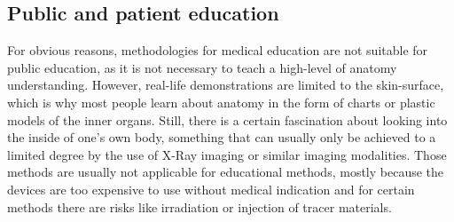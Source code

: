 \subsection{Public and patient education}
For obvious reasons, methodologies for medical education are not suitable for public education, as it is not necessary to teach a high-level of anatomy understanding. 
However, real-life demonstrations are limited to the skin-surface, which is why most people learn about anatomy in the form of charts or plastic models of the inner organs. Still, there is a certain fascination about looking into the inside of one's own body, something that can usually only be achieved to a limited degree by the use of X-Ray imaging or similar imaging modalities. Those methods are usually not applicable for educational methods, mostly because the devices are too expensive to use without medical indication and for certain methods there are risks like irradiation or injection of tracer materials.

